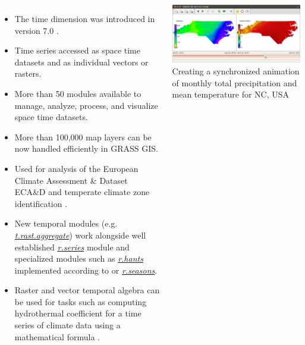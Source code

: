 \documentclass[25pt, margin=0mm, innermargin=25mm, blockverticalspace=25mm, colspace=25mm, subcolspace=8mm]{tikzposter}
\newcommand{\CustomBlockFontSize}{\Large}
\newcommand{\gmodule}[1]{\href{http://grass.osgeo.org/grass74/manuals/#1.html}{\emph{#1}}}
\newcommand{\gamodule}[1]{\href{http://grass.osgeo.org/grass74/manuals/addons/#1.html}{\emph{#1}}}
\begin{document}
\begin{columns}
{\CustomBlockFontSize

\begin{itemize}
 \item The time dimension was introduced in version 7.0 \citep{Gebbert20141, gebbert2015grass}.
 \item Time series accessed as space time datasets and as individual vectors or rasters.
 \item More than 50 modules available to manage, analyze, process, and visualize space time datasets.
 \item More than 100,000 map layers can be now handled efficiently in GRASS GIS.
 \item Used for analysis of the European Climate Assessment \& Dataset ECA\&D \citep{Haylock2008_climate_series}
       and temperate climate zone identification \citep{Gebbert20141}.
 \item New temporal modules (e.g. \gmodule{t.rast.aggregate}) work alongside well established \gmodule{r.series} module
       and specialized modules such as \gamodule{r.hants} implemented according to \cite{roerink2000reconstructing} or \gamodule{r.seasons}.
 \item Raster and vector temporal algebra can be used for tasks
       such as computing hydrothermal coefficient for a time series of climate data using a mathematical formula
       \citep{leppelt2015grass}.
\end{itemize}

\vspace*{.5ex}

\begin{minipage}{\linewidth}
\centering
\includegraphics[width=\linewidth]{images/temporal_precip_temp}
\\
Creating a synchronized animation of monthly total precipitation and mean temperature for NC, USA
\end{minipage}


}
\end{columns}
\end{document}
